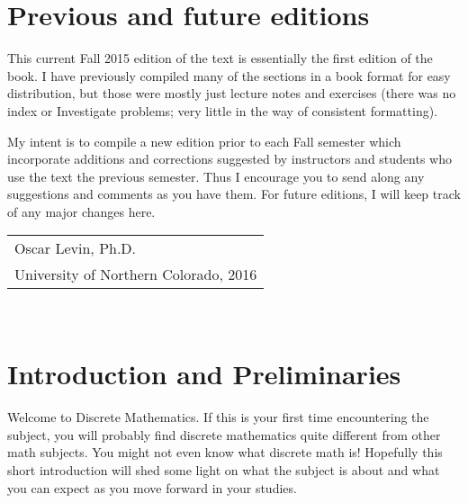 \documentclass[10pt,]{book}
\theoremstyle{plain}
\theoremstyle{definition}
\theoremstyle{definition}
\theoremstyle{definition}
\numberwithin{equation}{section}
\begin{document}
\chapter*{Previous and future editions}\label{pref_editions}

This current Fall 2015 edition of the text is essentially the first edition of the book. I have previously compiled many of the sections in a book format for easy distribution, but those were mostly just lecture notes and exercises (there was no index or Investigate problems; very little in the way of consistent formatting).
%
\par

My intent is to compile a new edition prior to each Fall semester which incorporate additions and corrections suggested by instructors and students who use the text the previous semester. Thus I encourage you to send along any suggestions and comments as you have them. For future editions, I will keep track of any major changes here.
%
\par\hfill\begin{tabular}{l@{}}
Oscar Levin, Ph.D.\\
University of Northern Colorado, 2016
\end{tabular}\\\par
\setcounter{tocdepth}{1}
\renewcommand*\contentsname{Contents}
\tableofcontents
\mainmatter
\typeout{************************************************}
\typeout{************************************************}
\chapter[Introduction and Preliminaries]{Introduction and Preliminaries}\label{ch_intro}
\typeout{************************************************}
\typeout{************************************************}

      Welcome to Discrete Mathematics. If this is your first time encountering the subject, you will probably find discrete mathematics quite different from other math subjects. You might not even know what discrete math is! Hopefully this short introduction
      will shed some light on what the subject is about and what you can expect as you move forward in your studies.
\typeout{************************************************}
\typeout{************************************************}
\end{document}
